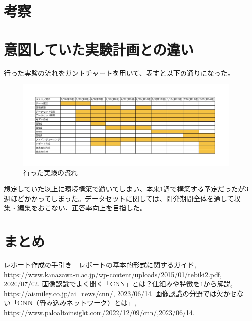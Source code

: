 \documentclass[a4paper, 11pt, titlepage]{jsarticle}
\begin{document}
\section{考察}


\section{意図していた実験計画との違い}
行った実験の流れをガントチャートを用いて、表すと以下の通りになった。\par
\begin{figure}[htbp]
\begin{center}
\includegraphics[width=150mm]{G2_Ganttchart.jpeg}
\caption{行った実験の流れ}
\end{center}
\end{figure}
想定していた以上に環境構築で躓いてしまい、本来1週で構築する予定だったが3週ほどかかってしまった。データセットに関しては、開発期間全体を通して収集・編集をおこない、正答率向上を目指した。

\section{まとめ}


\begin{thebibliography}{n}
  レポート作成の手引き　レポートの基本的形式に関するガイド, \url{https://www.kanazawa-u.ac.jp/wp-content/uploads/2015/01/tebiki2.pdf}, 2020/07/02.
	画像認識でよく聞く「CNN」とは？仕組みや特徴を1から解説, \url{https://aismiley.co.jp/ai_news/cnn/}, 2023/06/14.
	画像認識の分野では欠かせない「CNN（畳み込みネットワーク）とは」, \url{https://www.paloaltoinsight.com/2022/12/09/cnn/},2023/06/14.
\end{thebibliography}
\end{document}
